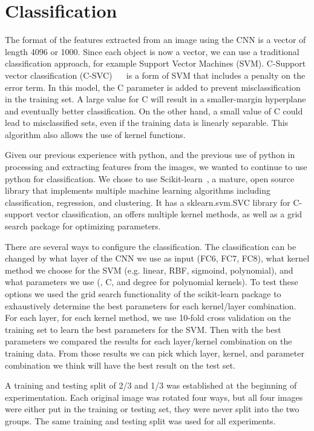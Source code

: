 \documentclass{article} %
\begin{document}
\section{Classification}

The format of the features extracted from an image using the CNN is a vector of length 4096 or 1000. Since each object is now a vector, we can use a traditional classification approach, for example Support Vector Machines (SVM). C-Support vector classification (C-SVC)~\citep{Boser et al., 1992} ~\citep{ Vapnik, 1995} is a form of SVM that includes a penalty on the error term. In this model, the C parameter is added to prevent misclassification in the training set. A large value for C will result in a smaller-margin hyperplane and eventually better classification. On the other hand, a small value of C could lead to misclassified sets, even if the training data is linearly separable. This algorithm also allows the use of kernel functions.

Given our previous experience with python, and the previous use of python in processing and extracting features from the images, we wanted to continue to use python for classification. We chose to use Scikit-learn~\citep{scikit-learn}, a mature, open source library that implements multiple machine learning algorithms including classification, regression, and clustering. It has a sklearn.svm.SVC library for C-support vector classification, an offers multiple kernel methods, as well as a grid search package for optimizing parameters.

There are several ways to configure the classification. The classification can be changed by what layer of the CNN we use as input (FC6, FC7, FC8), what kernel method we choose for the SVM (e.g. linear, RBF, sigmoind, polynomial), and what parameters we use (\gamma, C, and degree for polynomial kernels). To test these options we used the grid search functionality of the scikit-learn package to exhaustively determine the best parameters for each kernel/layer combination. For each layer, for each kernel method, we use 10-fold cross validation on the training set to learn the best parameters for the SVM. Then with the best parameters we compared the results for each layer/kernel combination on the training data. From those results we can pick which layer, kernel, and parameter combination we think will have the best result on the test set.

A training and testing split of 2/3 and 1/3 was established at the beginning of experimentation. Each original image was rotated four ways, but all four images were either put in the training or testing set, they were never split into the two groups. The same training and testing split was used for all experiments.
 
\end{document}
